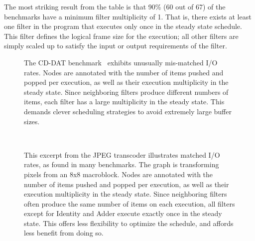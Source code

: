 
The most striking result from the table is that 90\% (60 out of 67) of
the benchmarks have a minimum filter multiplicity of 1.  That is,
there exists at least one filter in the program that executes only
once in the steady state schedule.  This filter defines the logical
frame size for the execution; all other filters are simply scaled up
to satisfy the input or output requirements of the filter.


\begin{figure}[t!]
\centering
{}
\vspace{-6pt}
\caption[CD-DAT, an example of mismatched I/O rates.]{The CD-DAT
  benchmark~\cite{murthy_buffer_2004} exhibits unusually mis-matched
  I/O rates.  Nodes are annotated with the number of items pushed and
  popped per execution, as well as their execution multiplicity in the
  steady state. Since neighboring filters produce different numbers of
  items, each filter has a large multiplicity in the steady state.
  This demands clever scheduling strategies to avoid extremely large
  buffer sizes.\protect\label{fig:cd-dat}}
~ \vspace{6pt} \\
\vspace{-18pt}
\caption[JPEG transcoder excerpt, an example of matched I/O rates.]{This 
excerpt from the JPEG transcoder illustrates matched I/O rates, as
found in many benchmarks.  The graph is transforming pixels from an
8x8 macroblock.  Nodes are annotated with the number of items pushed
and popped per execution, as well as their execution multiplicity in
the steady state.  Since neighboring filters often produce the same
number of items on each execution, all filters except for Identity and
Adder execute exactly once in the steady state.  This offers less
flexibility to optimize the schedule, and affords less benefit from
doing so.
\protect\label{fig:jpeg}}
\end{figure}


